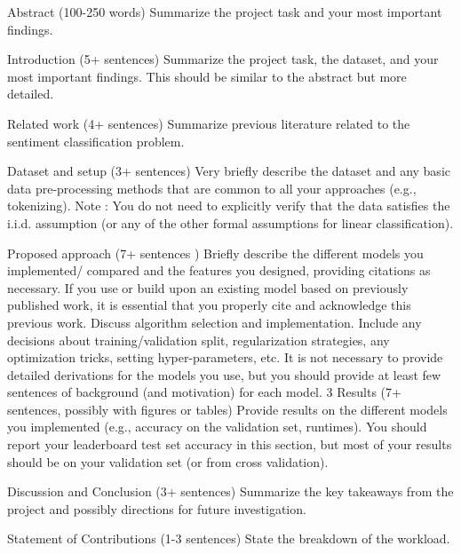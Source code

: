 Abstract (100-250 words) Summarize the project task and your most important findings.


Introduction (5+ sentences) Summarize the project task, the dataset, and your most important
findings. This should be similar to the abstract but more detailed.


Related work (4+ sentences) Summarize previous literature related to the sentiment classification
problem.


Dataset and setup (3+ sentences) Very briefly describe the dataset and any basic data
pre-processing methods that are common to all your approaches (e.g., tokenizing). Note : You do
not need to explicitly verify that the data satisfies the i.i.d. assumption (or any of the other formal
assumptions for linear classification).


Proposed approach (7+ sentences ) Briefly describe the different models you implemented/
compared and the features you designed, providing citations as necessary. If you use or build
upon an existing model based on previously published work, it is essential that you properly
cite and acknowledge this previous work. Discuss algorithm selection and implementation. Include
any decisions about training/validation split, regularization strategies, any optimization tricks,
setting hyper-parameters, etc. It is not necessary to provide detailed derivations for the models
you use, but you should provide at least few sentences of background (and motivation) for each
model.
3
Results (7+ sentences, possibly with figures or tables) Provide results on the different
models you implemented (e.g., accuracy on the validation set, runtimes). You should report your
leaderboard test set accuracy in this section, but most of your results should be on your validation
set (or from cross validation).

Discussion and Conclusion (3+ sentences) Summarize the key takeaways from the project
and possibly directions for future investigation.

Statement of Contributions (1-3 sentences) State the breakdown of the workload.